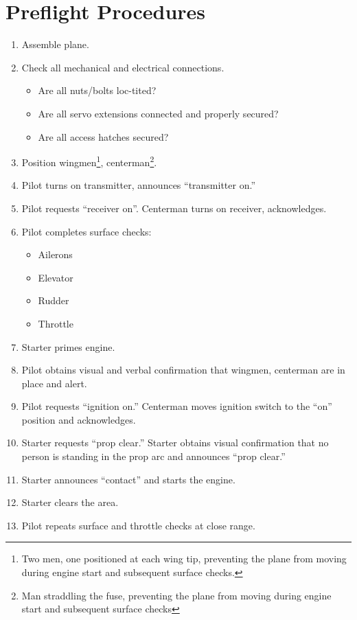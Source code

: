 \documentclass[pdftex,10pt,letter]{article}
\newcommand{\itemspace}{	\setlength{\itemsep}{0cm} \setlength{\parskip}{0cm}}
\begin{document}
\section{Preflight Procedures}
\label{sec:appendix_preflight}
\begin{enumerate}
	\setlength{\itemsep}{0cm}
	\setlength{\parskip}{0cm}
	\item Assemble plane.
	\item Check all mechanical and electrical connections.
		\begin{itemize}
		\itemspace
		\item Are all nuts/bolts loc-tited?
		\item Are all servo extensions connected and properly secured?
		\item Are all access hatches secured?
		\end{itemize}
	\item Position wingmen\footnote{Two men, one positioned at each wing tip, preventing the plane from moving during engine start and subsequent surface checks.}, centerman\footnote{Man straddling the fuse, preventing the plane from moving during engine start and subsequent surface checks}.
	\item Pilot turns on transmitter, announces ``transmitter on.''
	\item Pilot requests ``receiver on''.  Centerman turns on receiver, acknowledges.
	\item Pilot completes surface checks:
		\begin{itemize}
		\itemspace
		\item Ailerons
		\item Elevator
		\item Rudder
		\item Throttle
		\end{itemize}
	\item Starter primes engine.
	\item Pilot obtains visual and verbal confirmation that wingmen, centerman are in place and alert.
	\item Pilot requests ``ignition on.''  Centerman moves ignition switch to the ``on'' position and acknowledges.
	\item Starter requests ``prop clear.''  Starter obtains visual confirmation that no person is standing in the prop arc and announces ``prop clear.''
	\item Starter announces ``contact'' and starts the engine.
	\item Starter clears the area.
	\item Pilot repeats surface and throttle checks at close range.

\end{enumerate}
\end{document}
